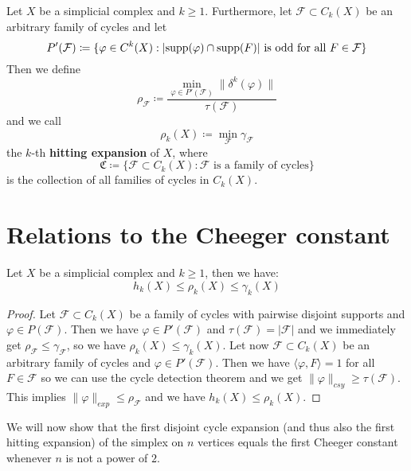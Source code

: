 \begin{defi}\label{definition412}
Let \(X\) be a simplicial complex and \(k\geq 1\). Furthermore, let \(\mathcal{F}\subset C_k(X)\) be an arbitrary family of cycles and let
\[
P'(\mathcal{F})\coloneqq\{\varphi\in C^k(X):|\mathrm{supp}(\varphi)\cap\mathrm{supp}(F)|\text{ is odd for all }F\in\mathcal{F}\}
\]
Then we define
\[
\rho_{\mathcal{F}}\coloneqq\frac{\min\limits_{\varphi\in P'(\mathcal{F})}\|\delta^k(\varphi)\|}{\tau(\mathcal{F})}
\]
and we call
\[
\rho_k(X)\coloneqq\min\limits_{\mathcal{F}}\gamma_{\mathcal{F}}
\]
the \(k\)-th \textbf{hitting expansion} of \(X\), where
\[
\mathfrak{C}\coloneqq\{\mathcal{F}\subset C_k(X):\mathcal{F}\text{ is a family of cycles}\}
\]
is the collection of all families of cycles in \(C_k(X)\).
\end{defi}

\section{Relations to the Cheeger constant}

\begin{prop}\label{proposition411}
Let \(X\) be a simplicial complex and \(k\geq 1\), then we have:
\[
h_k(X)\leq\rho_k(X)\leq\gamma_k(X)
\]
\begin{proof}
Let \(\mathcal{F}\subset C_k(X)\) be a family of cycles with pairwise disjoint supports and \(\varphi\in P(\mathcal{F})\). Then we have \(\varphi\in P'(\mathcal{F})\) and \(\tau(\mathcal{F})=|\mathcal{F}|\) and we immediately get \(\rho_{\mathcal{F}}\leq\gamma_{\mathcal{F}}\), so we have \(\rho_k(X)\leq\gamma_k(X)\). Let now \(\mathcal{F}\subset C_k(X)\) be an arbitrary family of cycles and \(\varphi\in P'(\mathcal{F})\). Then we have \(\langle\varphi,F\rangle=1\) for all \(F\in\mathcal{F}\) so we can use the cycle detection theorem and we get \(\|\varphi\|_{csy}\geq\tau(\mathcal{F})\). This implies \(\|\varphi\|_{exp}\leq\rho_{\mathcal{F}}\) and we have \(h_k(X)\leq\rho_k(X)\).
\end{proof}
\end{prop}

We will now show that the first disjoint cycle expansion (and thus also the first hitting expansion) of the simplex on \(n\) vertices equals the first Cheeger constant whenever \(n\) is not a power of \(2\).


